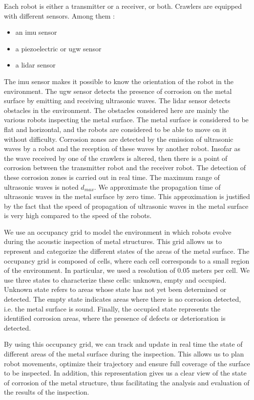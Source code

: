 Each robot is either a transmitter or a receiver, or both.
Crawlers are equipped with different sensors.
Among them :
\begin{itemize}
	\item an \gls{imu} sensor
	\item a piezoelectric or \gls{ugw} sensor
	\item a \gls{lidar} sensor
\end{itemize}
The \gls{imu} sensor makes it possible to know the orientation of the robot in the environment.
The \gls{ugw} sensor detects the presence of corrosion on the metal surface by emitting and receiving ultrasonic waves.
The \gls{lidar} sensor detects obstacles in the environment.
The obstacles considered here are mainly the various robots inspecting the metal surface.
The metal surface is considered to be flat and horizontal, and the robots are considered to be able to move on it without difficulty.
Corrosion zones are detected by the emission of ultrasonic waves by a robot and the reception of these waves by another robot.
Insofar as the wave received by one of the crawlers is altered, then there is a point of corrosion between the transmitter robot and the receiver robot.
The detection of these corrosion zones is carried out in real time.
The maximum range of ultrasonic waves is noted $d_{max}$.
We approximate the propagation time of ultrasonic waves in the metal surface by zero time.
This approximation is justified by the fact that the speed of propagation of ultrasonic waves in the metal surface is very high compared to the speed of the robots.

We use an occupancy grid to model the environment in which robots evolve during the acoustic inspection of metal structures.
This grid allows us to represent and categorize the different states of the areas of the metal surface.
The occupancy grid is composed of cells, where each cell corresponds to a small region of the environment.
In particular, we used a resolution of 0.05 meters per cell.
We use three states to characterize these cells: unknown, empty and occupied.
Unknown state refers to areas whose state has not yet been determined or detected.
The empty state indicates areas where there is no corrosion detected, i.e. the metal surface is sound.
Finally, the occupied state represents the identified corrosion areas, where the presence of defects or deterioration is detected.

By using this occupancy grid, we can track and update in real time the state of different areas of the metal surface during the inspection.
This allows us to plan robot movements, optimize their trajectory and ensure full coverage of the surface to be inspected.
In addition, this representation gives us a clear view of the state of corrosion of the metal structure, thus facilitating the analysis and evaluation of the results of the inspection.


